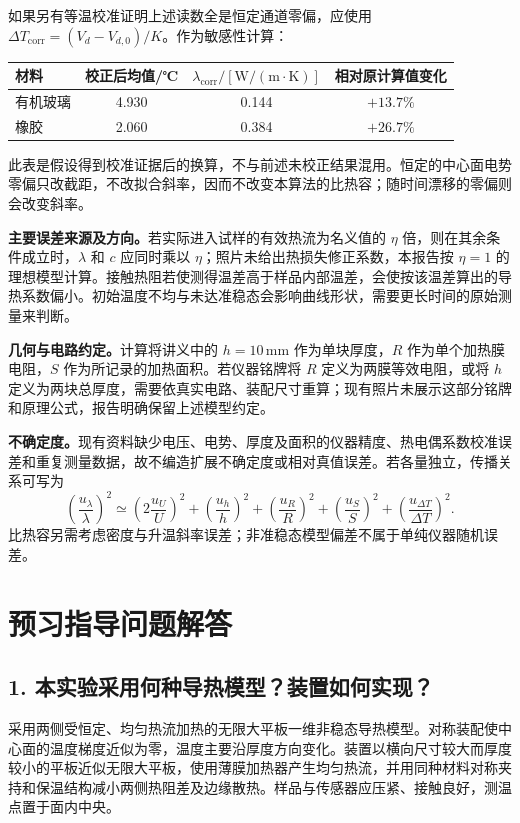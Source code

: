 \documentclass[UTF8,a4paper,11pt]{ctexart}
\newcommand{\unit}[1]{\,\mathrm{#1}}
\begin{document}
如果另有等温校准证明上述读数全是恒定通道零偏，应使用 $\Delta T_{\mathrm{corr}}=(V_d-V_{d,0})/K$。作为敏感性计算：
\begin{center}
\begin{tabular}{lccc}\toprule 材料 & 校正后均值/℃ & $\lambda_{\mathrm{corr}}/[\mathrm{W/(m\cdot K)}]$ & 相对原计算值变化\\\midrule
有机玻璃 & 4.930 & 0.144 & $+13.7\%$\\
橡胶 & 2.060 & 0.384 & $+26.7\%$\\\bottomrule
\end{tabular}
\end{center}
此表是假设得到校准证据后的换算，不与前述未校正结果混用。恒定的中心面电势零偏只改截距，不改拟合斜率，因而不改变本算法的比热容；随时间漂移的零偏则会改变斜率。

\textbf{主要误差来源及方向。}若实际进入试样的有效热流为名义值的 $\eta$ 倍，则在其余条件成立时，$\lambda$ 和 $c$ 应同时乘以 $\eta$；照片未给出热损失修正系数，本报告按 $\eta=1$ 的理想模型计算。接触热阻若使测得温差高于样品内部温差，会使按该温差算出的导热系数偏小。初始温度不均与未达准稳态会影响曲线形状，需要更长时间的原始测量来判断。

\textbf{几何与电路约定。}计算将讲义中的 $h=10\unit{mm}$ 作为单块厚度，$R$ 作为单个加热膜电阻，$S$ 作为所记录的加热面积。若仪器铭牌将 $R$ 定义为两膜等效电阻，或将 $h$ 定义为两块总厚度，需要依真实电路、装配尺寸重算；现有照片未展示这部分铭牌和原理公式，报告明确保留上述模型约定。

\textbf{不确定度。}现有资料缺少电压、电势、厚度及面积的仪器精度、热电偶系数校准误差和重复测量数据，故不编造扩展不确定度或相对真值误差。若各量独立，传播关系可写为
\[
\left(\frac{u_\lambda}{\lambda}\right)^2\simeq
\left(2\frac{u_U}{U}\right)^2+\left(\frac{u_h}{h}\right)^2+
\left(\frac{u_R}{R}\right)^2+\left(\frac{u_S}{S}\right)^2+
\left(\frac{u_{\Delta T}}{\Delta T}\right)^2.
\]
比热容另需考虑密度与升温斜率误差；非准稳态模型偏差不属于单纯仪器随机误差。

\clearpage
\section{预习指导问题解答}
\subsection*{1. 本实验采用何种导热模型？装置如何实现？}
采用两侧受恒定、均匀热流加热的无限大平板一维非稳态导热模型。对称装配使中心面的温度梯度近似为零，温度主要沿厚度方向变化。装置以横向尺寸较大而厚度较小的平板近似无限大平板，使用薄膜加热器产生均匀热流，并用同种材料对称夹持和保温结构减小两侧热阻差及边缘散热。样品与传感器应压紧、接触良好，测温点置于面内中央。
\end{document}

